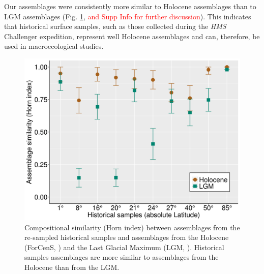 \documentclass[a4paper]{article}
\begin{document}
Our assemblages were consistently more similar to Holocene assemblages than to LGM assemblages (Fig. \ref{fig_chao}, \textcolor{red}{and Supp Info for further discussion}). This indicates that historical surface samples, such as those collected during the \textit{HMS} Challenger expedition, represent well Holocene assemblages and can, therefore, be used in macroecological studies.

\begin{figure}[htbp]
\caption{Compositional similarity (Horn index) between assemblages from the re-sampled historical samples and assemblages from the Holocene (ForCenS, \citealt{siccha2017forcens}) and the Last Glacial Maximum (LGM, \citealt{kucera2005reconstruction}). Historical samples assemblages are more similar to assemblages from the Holocene than from the LGM.}
\label{fig_chao}
\centering
\includegraphics[scale=0.15]{fig_similarity.png}
\end{figure}
\end{document}
